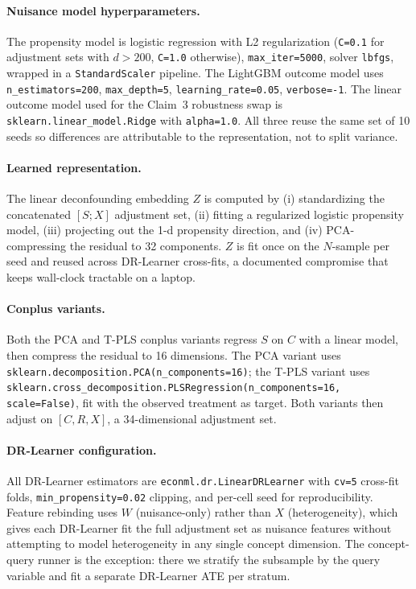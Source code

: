 \documentclass{article}
\begin{document}
\paragraph{Nuisance model hyperparameters.}
The propensity model is logistic regression with L2 regularization
(\texttt{C=0.1} for adjustment sets with $d>200$, \texttt{C=1.0} otherwise),
\texttt{max\_iter=5000}, solver \texttt{lbfgs}, wrapped in a
\texttt{StandardScaler} pipeline. The LightGBM outcome model uses
\texttt{n\_estimators=200}, \texttt{max\_depth=5}, \texttt{learning\_rate=0.05},
\texttt{verbose=-1}. The linear outcome model used for the Claim~3 robustness
swap is \texttt{sklearn.linear\_model.Ridge} with \texttt{alpha=1.0}. All
three reuse the same set of 10 seeds so differences are attributable to the
representation, not to split variance.

\paragraph{Learned representation.} The linear deconfounding embedding $Z$ is
computed by (i) standardizing the concatenated $[S; X]$ adjustment set,
(ii) fitting a regularized logistic propensity model, (iii) projecting out
the 1-d propensity direction, and (iv) PCA-compressing the residual to 32
components. $Z$ is fit once on the $N$-sample per seed and reused across
DR-Learner cross-fits, a documented compromise that keeps wall-clock
tractable on a laptop.

\paragraph{Conplus variants.} Both the PCA and T-PLS conplus variants
regress $S$ on $C$ with a linear model, then compress the residual to 16
dimensions. The PCA variant uses
\texttt{sklearn.decomposition.PCA(n\_components=16)}; the T-PLS variant uses
\texttt{sklearn.cross\_decomposition.PLSRegression(n\_components=16,
scale=False)}, fit with the observed treatment as target. Both variants
then adjust on $[C, R, X]$, a 34-dimensional adjustment set.

\paragraph{DR-Learner configuration.} All DR-Learner estimators are
\texttt{econml.dr.LinearDRLearner} with \texttt{cv=5} cross-fit folds,
\texttt{min\_propensity=0.02} clipping, and per-cell seed for reproducibility.
Feature rebinding uses $W$ (nuisance-only) rather than $X$ (heterogeneity),
which gives each DR-Learner fit the full adjustment set as nuisance features
without attempting to model heterogeneity in any single concept dimension.
The concept-query runner is the exception: there we stratify the subsample
by the query variable and fit a separate DR-Learner ATE per stratum.
\end{document}
